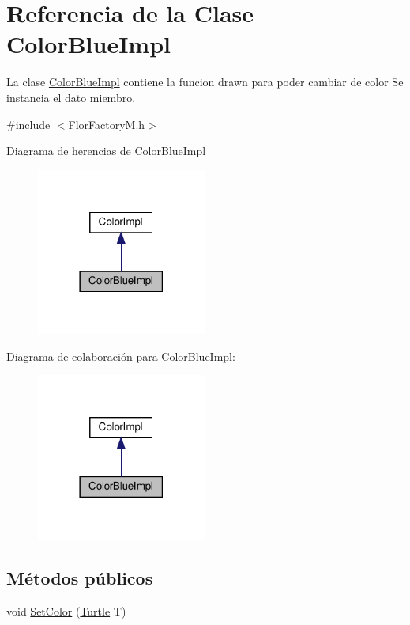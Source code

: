 \hypertarget{classColorBlueImpl}{}\section{Referencia de la Clase Color\+Blue\+Impl}
\label{classColorBlueImpl}


La clase \hyperlink{classColorBlueImpl}{Color\+Blue\+Impl} contiene la funcion drawn para poder cambiar de color  Se instancia el dato miembro.  




{\ttfamily \#include $<$Flor\+Factory\+M.\+h$>$}



Diagrama de herencias de Color\+Blue\+Impl
\nopagebreak
\begin{figure}[H]
\begin{center}
\leavevmode
\includegraphics[width=158pt]{classColorBlueImpl__inherit__graph}
\end{center}
\end{figure}


Diagrama de colaboración para Color\+Blue\+Impl\+:
\nopagebreak
\begin{figure}[H]
\begin{center}
\leavevmode
\includegraphics[width=158pt]{classColorBlueImpl__coll__graph}
\end{center}
\end{figure}
\subsection*{Métodos públicos}
\begin{DoxyCompactItemize}
\item 
void \hyperlink{classColorBlueImpl_aa18a3e0b37de1bafbd4954fc73df7462}{Set\+Color} (\hyperlink{classTurtle}{Turtle} T)
\end{DoxyCompactItemize}


